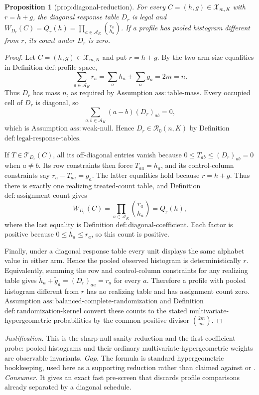 \documentclass{article}
\newtheorem{proposition}{Proposition}
\begin{document}
\begin{proposition}[prop:diagonal-reduction]\label{prop:diagonal-reduction}
For every \(C=(h,g)\in\mathcal X_{m,K}\) with \(r=h+g\), the diagonal response table \(D_r\) is legal and \(W_{D_r}(C)=Q_r(h)=\prod_{a\in\mathcal A_K}\binom{r_a}{h_a}\). If a profile has pooled histogram different from \(r\), its count under \(D_r\) is zero.
\end{proposition}
\begin{proof}
Let \(C=(h,g)\in\mathcal X_{m,K}\) and put \(r=h+g\). By the two arm-size equalities in Definition \(\mathrm{def{:}profile\text{-}space}\),
\[
\sum_{a\in\mathcal A_K}r_a
=\sum_a h_a+\sum_a g_a=2m=n.
\]
Thus \(D_r\) has mass \(n\), as required by Assumption \(\mathrm{ass{:}table\text{-}mass}\). Every occupied cell of \(D_r\) is diagonal, so
\[
\sum_{a,b\in\mathcal A_K}(a-b)(D_r)_{ab}=0,
\]
which is Assumption \(\mathrm{ass{:}weak\text{-}null}\). Hence \(D_r\in\mathcal R_0(n,K)\) by Definition \(\mathrm{def{:}legal\text{-}response\text{-}tables}\).

If \(T\in\mathcal T_{D_r}(C)\), all its off-diagonal entries vanish because \(0\leq T_{ab}\leq(D_r)_{ab}=0\) when \(a\neq b\). Its row constraints then force \(T_{aa}=h_a\), and its control-column constraints say \(r_a-T_{aa}=g_a\). The latter equalities hold because \(r=h+g\). Thus there is exactly one realizing treated-count table, and Definition \(\mathrm{def{:}assignment\text{-}count}\) gives
\[
W_{D_r}(C)
=\prod_{a\in\mathcal A_K}\binom{r_a}{h_a}
=Q_r(h),
\]
where the last equality is Definition \(\mathrm{def{:}diagonal\text{-}coefficient}\). Each factor is positive because \(0\leq h_a\leq r_a\), so this count is positive.

Finally, under a diagonal response table every unit displays the same alphabet value in either arm. Hence the pooled observed histogram is deterministically \(r\). Equivalently, summing the row and control-column constraints for any realizing table gives \(\widetilde h_a+\widetilde g_a=(D_r)_{aa}=r_a\) for every \(a\). Therefore a profile with pooled histogram different from \(r\) has no realizing table and has assignment count zero. Assumption \(\mathrm{ass{:}balanced\text{-}complete\text{-}randomization}\) and Definition \(\mathrm{def{:}randomization\text{-}kernel}\) convert these counts to the stated multivariate-hypergeometric probabilities by the common positive divisor \(\binom{2m}{m}\).
\end{proof}
\par\smallskip\noindent \textit{Justification.} This is the sharp-null sanity reduction and the first coefficient probe: pooled histograms and their ordinary multivariate-hypergeometric weights are observable invariants. \textit{Gap.} The formula is standard hypergeometric bookkeeping, used here as a supporting reduction rather than claimed against \cite{RigdonHudgens2015} or \cite{LiDing2016}. \textit{Consumer.} It gives an exact fast pre-screen that discards profile comparisons already separated by a diagonal schedule.
\end{document}
